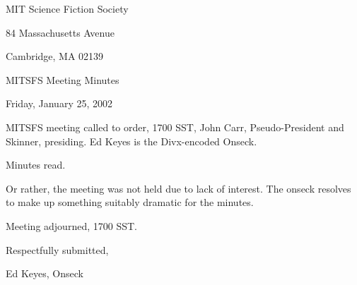 \documentclass[12pt]{article}
\begin{document}
\begin{center}

MIT Science Fiction Society 

84 Massachusetts Avenue

Cambridge, MA 02139

\vspace{12pt}

MITSFS Meeting Minutes 

Friday, January 25, 2002

\end{center}
 
\vspace{18pt}

\setlength{\parskip}{6pt}

\noindent
MITSFS meeting called to order, 1700 SST, John Carr, Pseudo-President and Skinner, presiding.  Ed Keyes is the Divx-encoded Onseck.

Minutes read.

Or rather, the meeting was not held due to lack of interest. The onseck resolves to make up something suitably dramatic for the minutes.

\vspace{12pt}

\noindent
Meeting adjourned, 1700 SST.

\vspace{18pt}

\centerline{Respectfully submitted,}
\centerline{Ed Keyes, Onseck}
\end{document}
